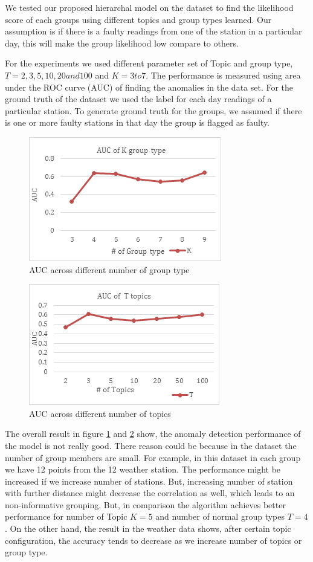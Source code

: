 \documentclass[letterpaper]{article}
\begin{document}
We tested our proposed hierarchal model on the dataset to find the likelihood score of each groups using different topics and group types learned. Our assumption is if there is a faulty readings from one of the station in a particular day, this will make the group likelihood low compare to others.

For the experiments we used different parameter set of Topic and group type, $T=2, 3, 5, 10, 20 and 100$ and $K= 3 to 7$.  The performance is measured using area under the ROC curve (AUC) of finding the anomalies in the data set. For the ground truth of the dataset we used the label for each day readings of a particular station. To generate ground truth for the groups, we assumed if there is one or more faulty stations in that day the group is flagged as faulty.

\begin{figure}
\includegraphics{grouptype.png}
\caption{AUC across different number of group type}
\label{weathergroupauc}
\end{figure}

\begin{figure}
\includegraphics{topic.png}
\caption{AUC across different number of topics}
\label{weathertopicauc}
\end{figure}

The overall result in figure \ref{weathergroupauc} and \ref{weathertopicauc} show, the anomaly detection performance of the model is not really good. There reason could be because in the dataset the number of group members are small. For example, in this dataset in each group we have 12 points from the 12 weather station. The performance might be increased if we increase number of stations. But, increasing number of station with further distance might decrease the correlation as well, which leads to an non-informative grouping. But, in comparison the algorithm achieves better performance for number of Topic $K=5$ and number of normal group types $T=4$. On the other hand, the result in the weather data shows, after certain topic configuration, the accuracy tends to decrease as we increase number of topics or group type.
\end{document}
